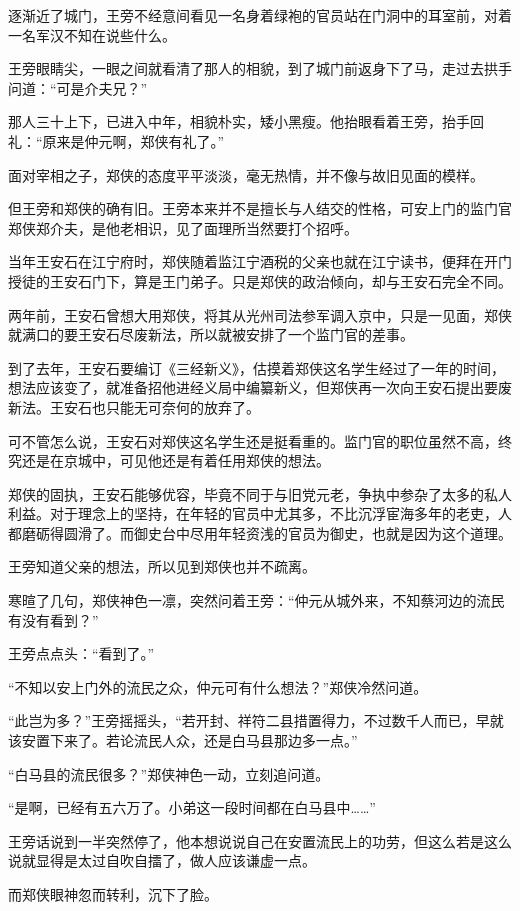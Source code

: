 逐渐近了城门，王旁不经意间看见一名身着绿袍的官员站在门洞中的耳室前，对着一名军汉不知在说些什么。

王旁眼睛尖，一眼之间就看清了那人的相貌，到了城门前返身下了马，走过去拱手问道：“可是介夫兄？”

那人三十上下，已进入中年，相貌朴实，矮小黑瘦。他抬眼看着王旁，抬手回礼：“原来是仲元啊，郑侠有礼了。”

面对宰相之子，郑侠的态度平平淡淡，毫无热情，并不像与故旧见面的模样。

但王旁和郑侠的确有旧。王旁本来并不是擅长与人结交的性格，可安上门的监门官郑侠郑介夫，是他老相识，见了面理所当然要打个招呼。

当年王安石在江宁府时，郑侠随着监江宁酒税的父亲也就在江宁读书，便拜在开门授徒的王安石门下，算是王门弟子。只是郑侠的政治倾向，却与王安石完全不同。

两年前，王安石曾想大用郑侠，将其从光州司法参军调入京中，只是一见面，郑侠就满口的要王安石尽废新法，所以就被安排了一个监门官的差事。

到了去年，王安石要编订《三经新义》，估摸着郑侠这名学生经过了一年的时间，想法应该变了，就准备招他进经义局中编纂新义，但郑侠再一次向王安石提出要废新法。王安石也只能无可奈何的放弃了。

可不管怎么说，王安石对郑侠这名学生还是挺看重的。监门官的职位虽然不高，终究还是在京城中，可见他还是有着任用郑侠的想法。

郑侠的固执，王安石能够优容，毕竟不同于与旧党元老，争执中参杂了太多的私人利益。对于理念上的坚持，在年轻的官员中尤其多，不比沉浮宦海多年的老吏，人都磨砺得圆滑了。而御史台中尽用年轻资浅的官员为御史，也就是因为这个道理。

王旁知道父亲的想法，所以见到郑侠也并不疏离。

寒暄了几句，郑侠神色一凛，突然问着王旁：“仲元从城外来，不知蔡河边的流民有没有看到？”

王旁点点头：“看到了。”

“不知以安上门外的流民之众，仲元可有什么想法？”郑侠冷然问道。

“此岂为多？”王旁摇摇头，“若开封、祥符二县措置得力，不过数千人而已，早就该安置下来了。若论流民人众，还是白马县那边多一点。”

“白马县的流民很多？”郑侠神色一动，立刻追问道。

“是啊，已经有五六万了。小弟这一段时间都在白马县中……”

王旁话说到一半突然停了，他本想说说自己在安置流民上的功劳，但这么若是这么说就显得是太过自吹自擂了，做人应该谦虚一点。

而郑侠眼神忽而转利，沉下了脸。

